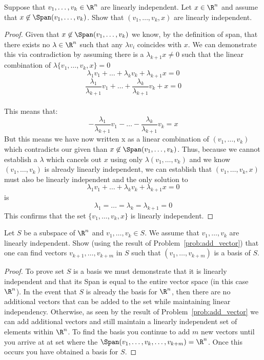 \documentclass[11pt,nocut]{article}
\begin{document}
\vspace{1mm}

\begin{problem}[3 points]\label{prob:add_vector}
	Suppose that $v_1, \dots, v_k \in \R^n$ are linearly independent. Let $x \in \R^n$ and assume that $x \not\in \Span(v_1,\dots, v_k)$.
	Show that $(v_1,\dots,v_k,x)$ are linearly independent.
\end{problem}
\begin{proof}
Given that $x \not\in \Span(v_1, \dots, v_k)$ we know, by the definition of span, that there exists no $\lambda \in \R^n$ such that any $\lambda v_i$ coincides with $x$. We can demonstrate this via contradiction by assuming there is a $\lambda_{k+1}x \neq 0$ such that the linear combination of $\lambda \{v_1, \dots, v_k, x\}=0$ \\
$$
\lambda_1 v_1 + \dots + \lambda_k v_k + \lambda_{k+1} x = 0
$$
$$
\frac{\lambda_1}{\lambda_{k+1}} v_1 + \dots + \frac{\lambda_k}{\lambda_{k+1}} v_k+ x = 0
$$\\
This means that:\\
$$
-\frac{\lambda_1}{\lambda_{k+1}} v_1 - \dots - \frac{\lambda_k}{\lambda_{k+1}} v_k= x
$$
But this means we have now written x as a linear combination of $(v_1,\dots,v_k)$ which contradicts our given than $x \not\in \Span(v_1, \dots, v_k)$. Thus, because we cannot establish a $\lambda$ which cancels out $x$ using only $\lambda (v_1, \dots, v_k)$ and we know $(v_1, \dots, v_k)$ is already linearly independent, we can establish that $(v_1, \dots, v_k, x)$ must also be linearly independent and the only solution to
$$
\lambda_1 v_1 + \dots + \lambda_k v_k + \lambda_{k+1} x = 0
$$
is 
$$
\lambda_1 = \dots = \lambda_k = \lambda_{k+1} = 0
$$
This confirms that the set $\{v_1,\dots,v_k,x\}$ is linearly independent.
\end{proof}
\vspace{1mm}

\begin{problem}[2 points]
	Let $S$ be a subspace of $\R^n$ and $v_1, \dots, v_k \in S$.
	We assume that $v_1, \dots, v_k$ are linearly independent.
	Show (using the result of Problem~\ref{prob:add_vector}) that one can find vectors $v_{k+1}, \dots, v_{k+m}$ in $S$ such that $(v_1, \dots, v_{k+m})$ is a basis of $S$.
\end{problem}
\begin{proof}
To prove set $S$ is a basis we must demonstrate that it is linearly independent and that its Span is equal to the entire vector space (in this case $\R^n$). In the event that $S$ is already the basis for $\R^n$, then there are no additional vectors that can be added to the set while maintaining linear independency. Otherwise, as seen by the result of Problem~\ref{prob:add_vector} we can add additional vectors and still maintain a linearly independent set of elements within $\R^n$. To find the basis you continue to add $m$ new vectors until you arrive at at set where the $\Span(v_1,\dots,v_k,\dots, v_{k+m}) = \R^n$. Once this occurs you have obtained a basis for $S$.
\end{proof}
\end{document}
